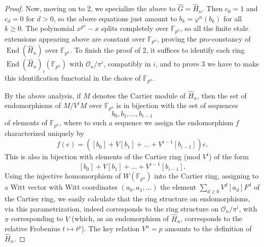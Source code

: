 \documentclass[10pt,a4paper]{amsart}
\newcommand{\on}{\operatorname}
\begin{document}
\begin{proof}
Now, moving on to 2, we specialize the above to $\widehat{G}=\widehat{H}_n$. Then $c_0=1$ and $c_d=0$ for $d>0$, so the above equations just amount to $b_k=\varphi^n(b_k)$ for all $k\geq 0$.  The polynomial $x^{p^n}-x$ splits completely over $\mathbb{F}_{p^n}$, so all the finite etale extensions appearing above are constant over $\mathbb{F}_{p^n}$, proving the pro-constancy of $\on{End}(\widehat{H}_n)$ over $\mathbb{F}_{p^n}$.  To finish the proof of 2, it suffices to identify each ring $\on{End}(\widehat{H}_n)_i(\mathbb{F}_{p^n})$ with $\mathcal{O}_n/\pi^i$, compatibly in $i$, and to prove 3 we have to make this identification functorial in the choice of $\mathbb{F}_{p^n}$.

By the above analysis, if $M$ denotes the Cartier module of $\widehat{H}_n$, then the set of endomorphisms of $M/V^i M$ over $\mathbb{F}_{p^n}$ is in bijection with the set of sequences
$$b_0,b_1,\ldots,b_{i-1}$$
of elements of $\mathbb{F}_{p^n}$, where to such a sequence we assign the endomorphism $f$ characterized uniquely by
$$f(e) = ([b_0] + V[b_1] + \ldots + V^{i-1}[b_{i-1}])e.$$
This is also in bijection with elements of the Cartier ring (mod $V^i$) of the form
$$[b_0] + V[b_1] + \ldots + V^{i-1}[b_{i-1}].$$
Using the injective homomorphism of $W(\mathbb{F}_{p^n})$ into the Cartier ring, assigning to a Witt vector with Witt coordinates $(a_0,a_1,\ldots)$ the element $\sum_{d\geq 0} V^d [a_d] F^d$ of the Cartier ring, we easily calculate that the ring structure on endomorphisms, via this parametrization, indeed corresponds to the ring structure on $\mathcal{O}_n/\pi^i$, with $\pi$ corresponding to $V$ (which, as an endomorphism of $\widehat{H}_n$, corresponds to the relative Frobenius $t\mapsto t^p$).  The key relation $V^n=p$ amounts to the definition of $\widehat{H}_n$.
\end{proof}
\end{document}
